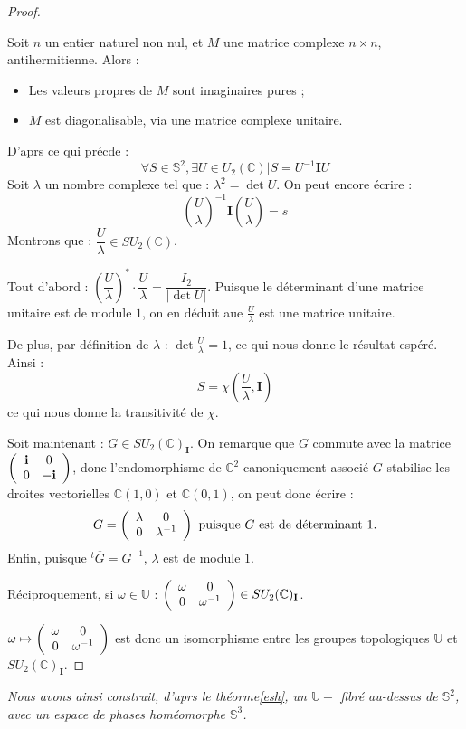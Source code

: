 \begin{proof}
\begin{prop}
Soit $n$ un entier naturel non nul, et $M$ une matrice complexe $n\times n$, antihermitienne. Alors :
\begin{itemize}
\item Les valeurs propres de $M$ sont imaginaires pures ;
\item $M$ est diagonalisable, via une matrice complexe unitaire.
\end{itemize}
\end{prop}
D'aprs ce qui pr\'ecde :
\[\forall S\in\mathbb{S}^2,\exists U\in U_2(\mathbb{C})|S=U^{-1}\mathbf{I}U\]
Soit $\lambda$ un nombre complexe tel que : $\lambda^2=\det U$. On peut encore \'ecrire :
\[\left(\dfrac{U}{\lambda}\right)^{-1}\mathbf{I}\left(\dfrac{U}{\lambda}\right)=s\]
Montrons que : $\dfrac{U}{\lambda}\in SU_2(\mathbb{C})$.
\par
Tout d'abord : $\left(\dfrac{U}{\lambda}\right)^{\ast}\cdot\dfrac{U}{\lambda}=\dfrac{I_2}{|\det U|}$. %
Puisque le d\'eterminant d'une matrice unitaire est de module $1$, on en d\'eduit aue $\frac{U}{\lambda}$ est une matrice unitaire.
\par
De plus, par d\'efinition de $\lambda$ : $\det \frac{U}{\lambda}=1$, ce qui nous donne le r\'esultat esp\'er\'e. Ainsi :
\[S=\chi\left(\frac{U}{\lambda},\mathbf{I}\right)\]
ce qui nous donne la transitivit\'e de $\chi$.
\par
Soit maintenant : $G\in SU_2(\mathbb{C})_{\mathbf{I}}$. On remarque que $G$ commute avec la matrice $\left(\begin{array}{cc}\mathbf{i}&0\\0&-\mathbf{i}\end{array}\right)$, %
donc l'endomorphisme de $\mathbb{C}^2$ canoniquement associ\'e  $G$ stabilise les droites vectorielles $\mathbb{C}(1,0)$ et $\mathbb{C}(0,1)$, %
on peut donc \'ecrire :
\[G=\left(\begin{array}{cc}\lambda&0\\0&\lambda^{-1}\end{array}\right)\text{ puisque $G$ est de d\'eterminant $1$.}\]
Enfin, puisque $^t\overline{G}=G^{-1}$, $\lambda$ est de module $1$.
\par
R\'eciproquement, si $\omega\in\mathbb{U}$ : $\left(\begin{array}{cc}\omega&0\\0&\omega^{-1}\end{array}\right)\in SU_2(\mathbb{C})_{\mathbf{I}}$.
\par
$\omega\mapsto\left(\begin{array}{cc}\omega&0\\0&\omega^{-1}\end{array}\right)$ est donc un isomorphisme entre les groupes topologiques $\mathbb{U}$ et $SU_2(\mathbb{C})_{\mathbf{I}}$.
\end{proof}

\etoile

\emph{Nous avons ainsi construit, d'aprs le th\'eorme\ref{esh}, un $\mathbb{U}-$ fibr\'e au-dessus de $\mathbb{S}^2$, %
avec un espace de phases hom\'eomorphe  $\mathbb{S}^3$.}

